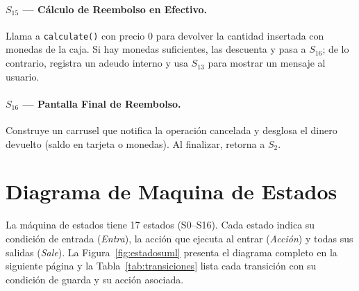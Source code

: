 \documentclass[12pt,a4paper]{article}
\begin{document}
\paragraph{$S_{15}$ — Cálculo de Reembolso en Efectivo.} Llama a \texttt{calculate()} con precio $0$ para devolver la cantidad insertada con monedas de la caja. Si hay monedas suficientes, las descuenta y pasa a $S_{16}$; de lo contrario, registra un adeudo interno y usa $S_{13}$ para mostrar un mensaje al usuario.

\paragraph{$S_{16}$ — Pantalla Final de Reembolso.} Construye un carrusel que notifica la operación cancelada y desglosa el dinero devuelto (saldo en tarjeta o monedas). Al finalizar, retorna a $S_2$.

\section{Diagrama de Maquina de Estados}

La m\'aquina de estados tiene 17 estados (S0--S16). Cada estado indica su
condici\'on de entrada (\textit{Entra}), la acci\'on que ejecuta al entrar
(\textit{Acci\'on}) y todas sus salidas (\textit{Sale}). La
Figura~\ref{fig:estadosuml} presenta el diagrama completo en la siguiente
p\'agina y la Tabla~\ref{tab:transiciones} lista cada transici\'on con su
condici\'on de guarda y su acci\'on asociada.

\clearpage
\pdfpagewidth=72cm
\pdfpageheight=52cm
\paperwidth=72cm
\paperheight=52cm
\textwidth=70cm
\textheight=50cm
\vsize=50cm
\hsize=70cm
\pdfhorigin=1cm
\pdfvorigin=1cm
\oddsidemargin=0cm
\topmargin=0cm
\headheight=0cm
\headsep=0cm
\thispagestyle{empty}

\newcommand{\stt}[1]{\makebox[\linewidth][c]{\textbf{#1}}\\[1pt]\rule{\linewidth}{0.3pt}\\[1pt]}
\newcommand{\ssep}{\\[1pt]\rule{\linewidth}{0.3pt}\\[1pt]}
\newcommand{\ent}{\textbf{Entra:}~}
\newcommand{\act}{\textbf{Acci\'on:}~}
\newcommand{\sal}{\textbf{Sale:}}
\newcommand{\tin}{$T_{\mathrm{inact}}$}
\end{document}
